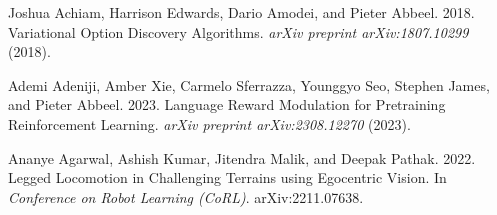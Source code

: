\documentclass[acmsmall,screen,nonacm]{acmart}
\begin{document}

%
%
%
%

\begin{thebibliography}{311}

%
%
%
%
%
%
%
%
%
%
%
%
%
%
%
%

\ifx \showCODEN    \undefined {}     \fi
\ifx \showDOI      \undefined \def \showDOI       #1{#1}\fi
\ifx \showISBNx    \undefined \def \showISBNx     #1{\unskip}     \fi
\ifx \showISBNxiii \undefined \def \showISBNxiii  #1{\unskip}     \fi
\ifx \showISSN     \undefined \def \showISSN      #1{\unskip}     \fi
\ifx \showLCCN     \undefined \def \showLCCN      #1{\unskip}     \fi
\ifx \shownote     \undefined \def \shownote      #1{#1}          \fi
\ifx \showarticletitle \undefined \def \showarticletitle #1{#1}   \fi
\ifx \showURL      \undefined \def \showURL       {\relax}        \fi
%
%
\providecommand\bibfield[2]{#2}
\providecommand\bibinfo[2]{#2}
\providecommand\natexlab[1]{#1}
\providecommand\showeprint[2][]{arXiv:#2}

\bibfield{author}{\bibinfo{person}{Joshua Achiam}, \bibinfo{person}{Harrison
  Edwards}, \bibinfo{person}{Dario Amodei}, {and} \bibinfo{person}{Pieter
  Abbeel}.} \bibinfo{year}{2018}\natexlab{}.
\newblock \showarticletitle{Variational Option Discovery Algorithms}.
\newblock \bibinfo{journal}{\emph{arXiv preprint arXiv:1807.10299}}
  (\bibinfo{year}{2018}).
\newblock


\bibfield{author}{\bibinfo{person}{Ademi Adeniji}, \bibinfo{person}{Amber Xie},
  \bibinfo{person}{Carmelo Sferrazza}, \bibinfo{person}{Younggyo Seo},
  \bibinfo{person}{Stephen James}, {and} \bibinfo{person}{Pieter Abbeel}.}
  \bibinfo{year}{2023}\natexlab{}.
\newblock \showarticletitle{Language Reward Modulation for Pretraining
  Reinforcement Learning}.
\newblock \bibinfo{journal}{\emph{arXiv preprint arXiv:2308.12270}}
  (\bibinfo{year}{2023}).
\newblock


\bibfield{author}{\bibinfo{person}{Ananye Agarwal}, \bibinfo{person}{Ashish
  Kumar}, \bibinfo{person}{Jitendra Malik}, {and} \bibinfo{person}{Deepak
  Pathak}.} \bibinfo{year}{2022}\natexlab{}.
\newblock \showarticletitle{Legged Locomotion in Challenging Terrains using
  Egocentric Vision}. In \bibinfo{booktitle}{\emph{Conference on Robot Learning
  (CoRL)}}.
\newblock
\newblock
\shownote{arXiv:2211.07638}.



\end{thebibliography}
\end{document}
